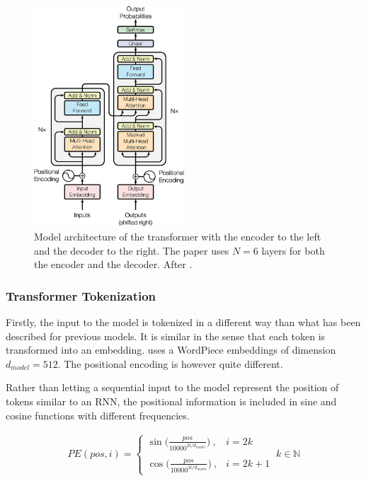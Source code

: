 \begin{figure}[ht]
    \centering
    \includegraphics[width=0.5\textwidth]{Figures/The-Transformer-model-architecture.png}
    \caption{Model architecture of the transformer with the encoder to the left and the decoder to the right. The paper uses $N = 6$ layers for both the encoder and the decoder. After \citet{NIPS2017_7181}.}
    \label{fig:tr_arch}
\end{figure}

\subsubsection{Transformer Tokenization}\label{sec:transtok}

Firstly, the input to the model is tokenized in a different way than what has been described for previous models. It is similar in the sense that each token is transformed into an embedding. \citet{NIPS2017_7181} uses a WordPiece embeddings of dimension $d_{model} = 512$. The positional encoding is however quite different. 

Rather than letting a sequential input to the model represent the position of tokens similar to an RNN, the positional information is included in sine and cosine functions with different frequencies. 

\begin{align}
    PE(pos,i) = \begin{cases}
    \sin\displaystyle{\Big(\frac{pos}{10000^{2i/d_{model}}}\Big)} \ , & i = 2k \\
    \\
    \cos\displaystyle{\Big(\frac{pos}{10000^{2i/d_{model}}}\Big) }\ , & i = 2k + 1 
    \end{cases} \   k \in \mathbb{N}
    \label{eq:posid}
\end{align}

